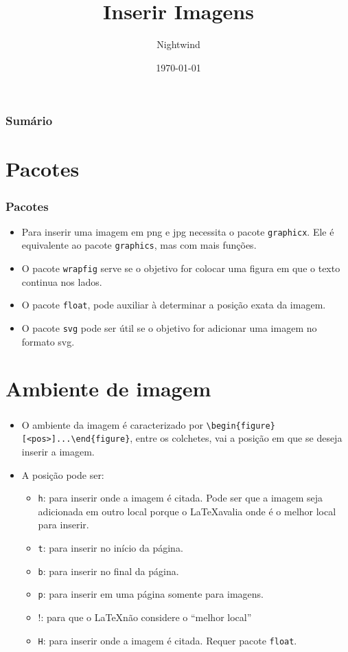 \documentclass{beamer}
\title{Inserir Imagens}
\author{Nightwind}
\institute[CTISM]{Colégio Técnico Industrial de Santa Maria}
\date{\today}
\begin{document}
\frame{\titlepage}

\begin{frame}
    \frametitle{Sumário}
    \tableofcontents
\end{frame}

\section{Pacotes}

\begin{frame}[fragile]
    \frametitle{Pacotes}

    \begin{itemize}
        \item Para inserir uma imagem em png e jpg necessita o pacote \texttt{graphicx}. Ele é equivalente ao pacote \texttt{graphics}, mas com mais funções.
        \item O pacote \texttt{wrapfig} serve se o objetivo for colocar uma figura em que o texto continua nos lados.
        \item O pacote \texttt{float}, pode auxiliar à determinar a posição exata da imagem.
        \item O pacote \texttt{svg} pode ser útil se o objetivo for adicionar uma imagem no formato svg.
    \end{itemize}

\end{frame}

\section{Ambiente de imagem}

\begin{frame}[fragile]
    \frametitle{}
    \begin{itemize}
        \item O ambiente da imagem é caracterizado por \lstinline[style=myStyleLatex]!\begin{figure}[<pos>]...\end{figure}!, entre os colchetes, vai a posição em que se deseja inserir a imagem.
        \item A posição pode ser:
              \begin{itemize}
                  \item \texttt{h}: para inserir onde a imagem é citada. Pode ser que a imagem seja adicionada em outro local porque o \LaTeX avalia onde é o melhor local para inserir.
                  \item \texttt{t}: para inserir no início da página.
                  \item \texttt{b}: para inserir no final da página.
                  \item \texttt{p}: para inserir em uma página somente para imagens.
                  \item !: para que o \LaTeX não considere o ``melhor local''
                  \item \texttt{H}: para inserir onde a imagem é citada. Requer pacote \texttt{float}.
              \end{itemize}
    \end{itemize}
\end{frame}
\end{document}
